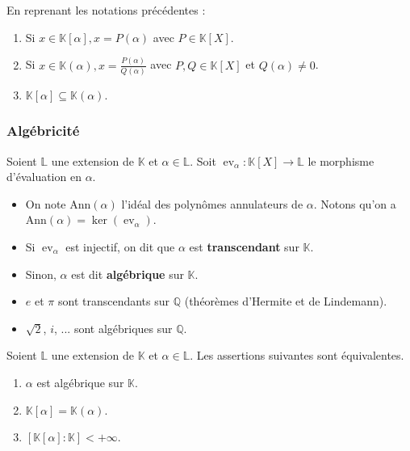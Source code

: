   \begin{proposition}
    En reprenant les notations précédentes :
    \begin{enumerate}[label=(\roman*)]
      \item Si $x \in \mathbb{K}[\alpha], x = P(\alpha)$ avec $P \in \mathbb{K}[X]$.
      \item Si $x \in \mathbb{K}(\alpha), x = \frac{P(\alpha)}{Q(\alpha)}$ avec $P, Q \in \mathbb{K}[X]$ et $Q(\alpha) \neq 0$.
      \item $\mathbb{K}[\alpha] \subseteq \mathbb{K}(\alpha)$.
    \end{enumerate}
  \end{proposition}

  \subsubsection{Algébricité}

  \begin{definition}
    Soient $\mathbb{L}$ une extension de $\mathbb{K}$ et $\alpha \in \mathbb{L}$. Soit $\operatorname{ev}_\alpha : \mathbb{K}[X] \rightarrow \mathbb{L}$ le morphisme d'évaluation en $\alpha$.
    \begin{itemize}
      \item On note $\mathrm{Ann}(\alpha)$ l'idéal des polynômes annulateurs de $\alpha$. Notons qu'on a $\mathrm{Ann}(\alpha) = \ker(\operatorname{ev}_\alpha)$.
      \item Si $\operatorname{ev}_\alpha$ est injectif, on dit que $\alpha$ est \textbf{transcendant} sur $\mathbb{K}$.
      \item Sinon, $\alpha$ est dit \textbf{algébrique} sur $\mathbb{K}$.
    \end{itemize}
  \end{definition}

  \begin{example}
    \begin{itemize}
      \item $e$ et $\pi$ sont transcendants sur $\mathbb{Q}$ (théorèmes d'Hermite et de Lindemann).
      \item $\sqrt{2}$, $i$, ... sont algébriques sur $\mathbb{Q}$.
    \end{itemize}
  \end{example}

  \begin{proposition}
    Soient $\mathbb{L}$ une extension de $\mathbb{K}$ et $\alpha \in \mathbb{L}$. Les assertions suivantes sont équivalentes.
    \begin{enumerate}[label=(\roman*)]
      \item $\alpha$ est algébrique sur $\mathbb{K}$.
      \item $\mathbb{K}[\alpha] = \mathbb{K}(\alpha)$.
      \item $[\mathbb{K}[\alpha]:\mathbb{K}] < +\infty$.
    \end{enumerate}
  \end{proposition}

